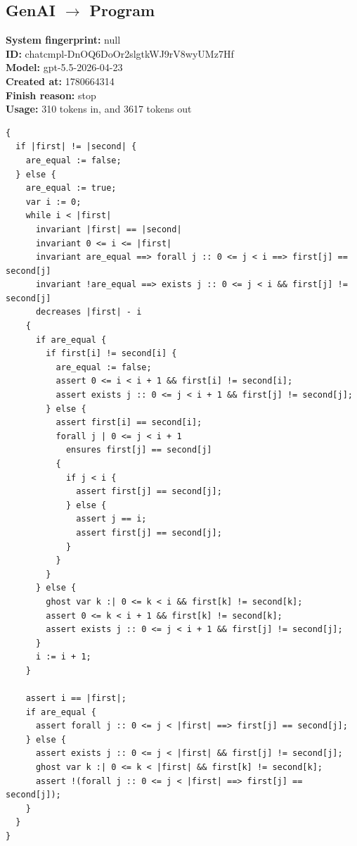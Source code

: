 \documentclass{article}
\begin{document}
\subsection*{GenAI $\rightarrow$ Program}
\textbf{System fingerprint: }null
\\\textbf{ID: }chatcmpl-DnOQ6DoOr2slgtkWJ9rV8wyUMz7Hf
\\\textbf{Model: }gpt-5.5-2026-04-23
\\\textbf{Created at: }1780664314
\\\textbf{Finish reason: }stop
\\\textbf{Usage: }310 tokens in, and 3617 tokens out
\begin{lstlisting}
{
  if |first| != |second| {
    are_equal := false;
  } else {
    are_equal := true;
    var i := 0;
    while i < |first|
      invariant |first| == |second|
      invariant 0 <= i <= |first|
      invariant are_equal ==> forall j :: 0 <= j < i ==> first[j] == second[j]
      invariant !are_equal ==> exists j :: 0 <= j < i && first[j] != second[j]
      decreases |first| - i
    {
      if are_equal {
        if first[i] != second[i] {
          are_equal := false;
          assert 0 <= i < i + 1 && first[i] != second[i];
          assert exists j :: 0 <= j < i + 1 && first[j] != second[j];
        } else {
          assert first[i] == second[i];
          forall j | 0 <= j < i + 1
            ensures first[j] == second[j]
          {
            if j < i {
              assert first[j] == second[j];
            } else {
              assert j == i;
              assert first[j] == second[j];
            }
          }
        }
      } else {
        ghost var k :| 0 <= k < i && first[k] != second[k];
        assert 0 <= k < i + 1 && first[k] != second[k];
        assert exists j :: 0 <= j < i + 1 && first[j] != second[j];
      }
      i := i + 1;
    }

    assert i == |first|;
    if are_equal {
      assert forall j :: 0 <= j < |first| ==> first[j] == second[j];
    } else {
      assert exists j :: 0 <= j < |first| && first[j] != second[j];
      ghost var k :| 0 <= k < |first| && first[k] != second[k];
      assert !(forall j :: 0 <= j < |first| ==> first[j] == second[j]);
    }
  }
}
\end{lstlisting}
\end{document}
